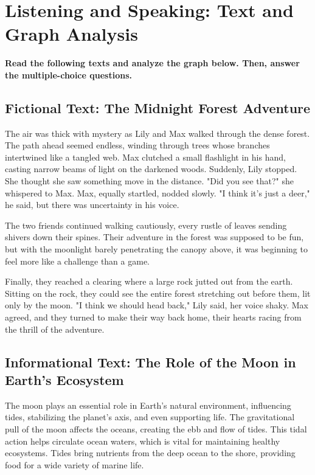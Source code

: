 \documentclass[12pt]{article}
\begin{document}
\onehalfspacing

\section*{Listening and Speaking: Text and Graph Analysis}

\textbf{Read the following texts and analyze the graph below. Then, answer the multiple-choice questions.}

\vspace{1cm}

\subsection*{Fictional Text: The Midnight Forest Adventure}

The air was thick with mystery as Lily and Max walked through the dense forest. The path ahead seemed endless, winding through trees whose branches intertwined like a tangled web. Max clutched a small flashlight in his hand, casting narrow beams of light on the darkened woods. Suddenly, Lily stopped. She thought she saw something move in the distance. "Did you see that?" she whispered to Max. Max, equally startled, nodded slowly. "I think it’s just a deer," he said, but there was uncertainty in his voice. 

The two friends continued walking cautiously, every rustle of leaves sending shivers down their spines. Their adventure in the forest was supposed to be fun, but with the moonlight barely penetrating the canopy above, it was beginning to feel more like a challenge than a game. 

Finally, they reached a clearing where a large rock jutted out from the earth. Sitting on the rock, they could see the entire forest stretching out before them, lit only by the moon. "I think we should head back," Lily said, her voice shaky. Max agreed, and they turned to make their way back home, their hearts racing from the thrill of the adventure.

\vspace{1cm}

\subsection*{Informational Text: The Role of the Moon in Earth's Ecosystem}

The moon plays an essential role in Earth's natural environment, influencing tides, stabilizing the planet's axis, and even supporting life. The gravitational pull of the moon affects the oceans, creating the ebb and flow of tides. This tidal action helps circulate ocean waters, which is vital for maintaining healthy ecosystems. Tides bring nutrients from the deep ocean to the shore, providing food for a wide variety of marine life.
\end{document}
